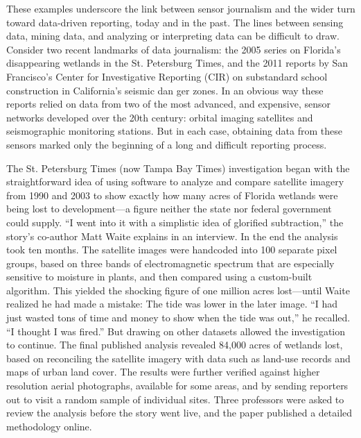 \begin{itemize}
\begin{itemized}
These examples underscore the link between sensor journalism and the
wider turn toward data-driven reporting, today and in the past. The lines
between sensing data, mining data, and analyzing or interpreting data can
be difficult to draw. Consider two recent landmarks of data journalism: the
2005 series on Florida's disappearing wetlands in the St. Petersburg Times,
and the 2011 reports by San Francisco's Center for Investigative Reporting
(CIR) on substandard school construction in California's seismic dan
ger zones. In an obvious way these reports relied on data from two of the
most advanced, and expensive, sensor networks developed over the 20th
century: orbital imaging satellites and seismographic monitoring stations.
But in each case, obtaining data from these sensors marked only the beginning
of a long and difficult reporting process.

The St. Petersburg Times (now Tampa Bay Times) investigation began with
the straightforward idea of using software to analyze and compare satellite
imagery from 1990 and 2003 to show exactly how many acres of Florida
wetlands were being lost to development—a figure neither the state nor federal
government could supply. ``I went into it with a simplistic idea of glorified
subtraction,'' the story's co-author Matt Waite explains in an interview.
In the end the analysis took ten months. The satellite images were handcoded
into 100 separate pixel groups, based on three bands of electromagnetic
spectrum that are especially sensitive to moisture in plants, and then
compared using a custom-built algorithm. This yielded the shocking figure
of one million acres lost—until Waite realized he had made a mistake: The
tide was lower in the later image. ``I had just wasted tons of time and money
to show when the tide was out,'' he recalled. ``I thought I was fired.'' But
drawing on other datasets allowed the investigation to continue. The final
published analysis revealed 84,000 acres of wetlands lost, based on reconciling
the satellite imagery with data such as land-use records and maps of
urban land cover. The results were further verified against higher resolution
aerial photographs, available for some areas, and by sending reporters out
to visit a random sample of individual sites. Three professors were asked
to review the analysis before the story went live, and the paper published a
detailed methodology online.


\end{itemized}
\end{itemize}
